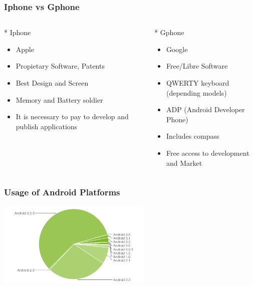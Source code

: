 \documentclass{beamer}
\begin{document}
\begin{frame}
\frametitle{Iphone vs Gphone}
\begin{columns}
\begin{column}{0.45\textwidth}
* Iphone
\begin{itemize}
 \item Apple
 \item Propietary Software, Patents
 \item Best Design and Screen
 \item Memory and Battery soldier
 \item It is necessary to pay to develop and publish applications
\end{itemize}
\end{column}
\begin{column}{0.55\textwidth}
* Gphone
\begin{itemize}
 \item Google
 \item Free/Libre Software
 \item QWERTY keyboard (depending models)
 \item ADP (Android Developer Phone)
 \item Includes compass
 \item Free access to development and Market
\end{itemize}
\end{column}
\end{columns}

\end{frame}

\begin{frame}
\frametitle{Usage of Android Platforms}

\begin{center}
\hspace{0.2cm}

\includegraphics[height=4.0cm]{figs/android-platform}

\hspace{0.2cm}

\end{center}
\end{frame}
\end{document}
